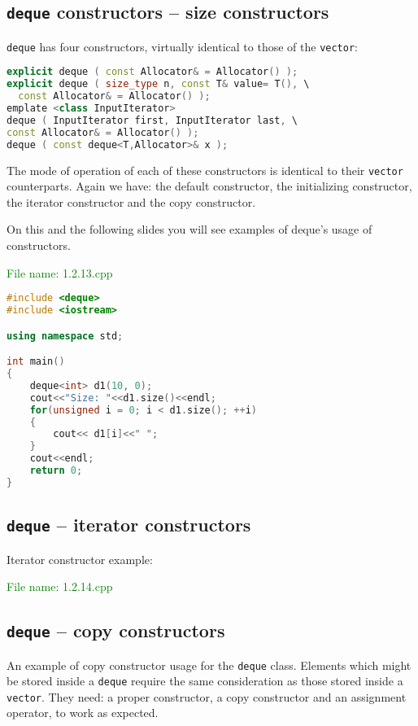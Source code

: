 \subsection{\texttt{deque} constructors – size constructors} %
\texttt{deque} has four constructors, virtually identical to those of the \texttt{vector}:
\begin{lstlisting}[language=C++]
explicit deque ( const Allocator& = Allocator() );
explicit deque ( size_type n, const T& value= T(), \
  const Allocator& = Allocator() );
emplate <class InputIterator> 
deque ( InputIterator first, InputIterator last, \
const Allocator& = Allocator() );
deque ( const deque<T,Allocator>& x );
\end{lstlisting}

The mode of operation of each of these constructors is identical to their \texttt{vector} counterparts. 
Again we have: the default constructor, the initializing constructor, the iterator constructor and 
the copy constructor.

On this and the following slides you will see examples of deque’s usage of constructors.

\textcolor{green}{File name: 1.2.13.cpp}
\begin{lstlisting}[language=C++]
#include <deque>
#include <iostream>

using namespace std;

int main()
{
    deque<int> d1(10, 0);
    cout<<"Size: "<<d1.size()<<endl;
    for(unsigned i = 0; i < d1.size(); ++i)
    {
        cout<< d1[i]<<" ";
    }
    cout<<endl;
    return 0;
}
\end{lstlisting}

\subsection{\texttt{deque} – iterator constructors} %
Iterator constructor example:

\textcolor{green}{File name: 1.2.14.cpp}


\subsection{\texttt{deque} – copy constructors} %
An example of copy constructor usage for the \texttt{deque} class.
Elements which might be stored inside a \texttt{deque} require the same consideration as 
those stored inside a \texttt{vector}. They need: a proper constructor, a copy constructor and 
an assignment operator, to work as expected.

